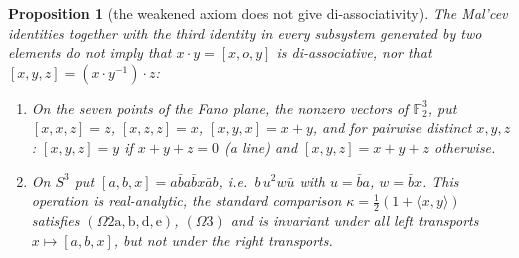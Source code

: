 \documentclass[11pt,reqno]{amsart}
\newtheorem{proposition}[theorem]{Proposition}
\theoremstyle{definition}
\theoremstyle{remark}
\numberwithin{equation}{section}
\newcommand{\ip}[2]{\langle #1,#2\rangle}
\newcommand{\hp}[3]{[#1,#2,#3]}
\begin{document}
\begin{proposition}[the weakened axiom does not give di-associativity]\label{prop:weaknot}
The Mal'cev identities together with the third identity in every subsystem generated by two elements do not imply that
$x\cdot y=\hp xoy$ is di-associative, nor that $\hp xyz=(x\cdot y^{-1})\cdot z$:
\begin{enumerate}[label=(\Alph*)]
\item On the seven points of the Fano plane, the nonzero vectors of $\mathbb F_2^3$, put $\hp xxz=z$, $\hp xzz=x$, $\hp xyx=x+y$, and for
pairwise distinct $x,y,z$: $\hp xyz=y$ if $x+y+z=0$ (a line) and $\hp xyz=x+y+z$ otherwise.
\item On $S^3$ put $\hp abx=a\bar ba\bar bx\bar ab$, i.e.\ $b\,u^2w\bar u$ with $u=\bar ba$, $w=\bar bx$.  This operation is real-analytic,
the standard comparison $\kappa=\tfrac12(1+\ip xy)$ satisfies $(\Omega2\mathrm{a,b,d,e})$, $(\Omega3)$ and is invariant under all left
transports $x\mapsto\hp abx$, but not under the right transports.
\end{enumerate}
\end{proposition}
\end{document}
